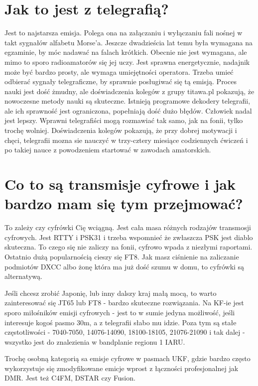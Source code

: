 \documentclass[a4paper,12pt]{article}
\begin{document}
\section{Jak to jest z telegrafią?}
Jest to najstarsza emisja. Polega ona na załączaniu i wyłączaniu fali nośnej w takt sygnałów alfabetu Morse'a. Jeszcze dwadzieścia lat temu była wymagana na egzaminie, by móc nadawać na falach krótkich. Obecnie nie jest wymagana, ale mimo to sporo radioamatorów się jej uczy. Jest sprawna energetycznie, nadajnik może być bardzo prosty, ale wymaga umiejętności operatora. Trzeba umieć odbierać sygnały telegraficzne, by sprawnie posługiwać się tą emisją. Proces nauki jest dość żmudny, ale doświadczenia kolegów z grupy titawa.pl pokazują, że nowoczesne metody nauki są skuteczne. Istnieją programowe dekodery telegrafii, ale ich sprawność jest ograniczona, popełniają dość dużo błędów. Człowiek nadal jest lepszy. Wprawni telegrafiści mogą rozmawiać tak samo, jak na fonii, tylko trochę wolniej. Doświadczenia kolegów pokazują, że przy dobrej motywacji i chęci, telegrafii mozna sie nauczyć w trzy-cztery miesiące codziennych ćwiczeń i po takiej nauce z powodzeniem startować w zawodach amatorskich.

\section{Co to są transmisje cyfrowe i jak bardzo mam się tym przejmować?}
To zależy czy cyfrówki Cię wciągną. 
Jest cała masa różnych rodzajów transmosji cyfrowych. Jest RTTY i PSK31 i trzeba wspomnieć że zwłaszcza PSK jest diablo skuteczna. To czego się nie zaliczy na fonii, cyfrowo wpada z niezłymi raportami. Ostatnio dużą popularnością cieszy się FT8.
Jak masz ciśnienie na zaliczanie podmiotów DXCC albo żonę która ma już dość szumu w domu, to cyfrówki są alternatywą.

Jeśli chcesz zrobić Japonię, lub inny dalszy kraj małą mocą, to warto zainteresować się JT65 lub FT8 - bardzo skuteczne rozwiązania. Na KF-ie jest sporo miłośników emisji cyfrowych - jest to w sumie jedyna możliwość, jeśli interesuje kogoś pasmo 30m, a z telegrafii słabo mu idzie. Poza tym są stałe częstotliwości - 7040-7050, 14076-14090, 18100-18105, 21076-21090 i tak dalej - wszystko jest do znalezienia w bandplanie regionu 1 IARU.

Trochę osobną kategorią sa emisje cyfrowe w pasmach UKF, gdzie bardzo często wykorzystuje się zmodyfikowane emicje wprost z łączności profesjonalnej jak DMR. Jest też C4FM, DSTAR czy Fusion.
\end{document}
